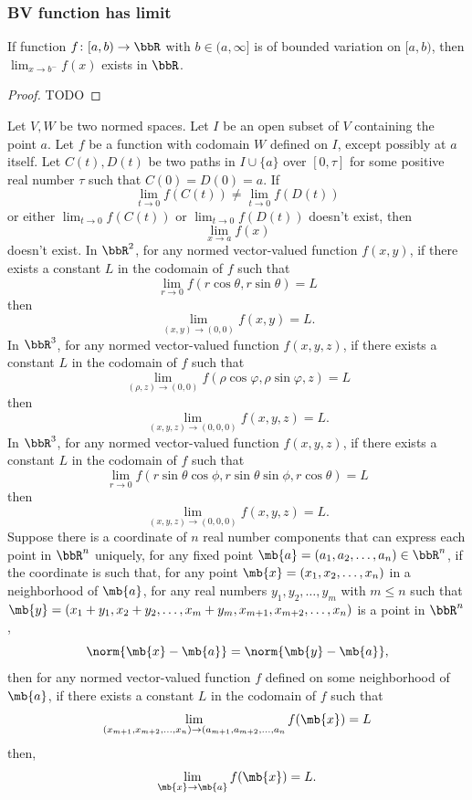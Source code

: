 \subsubsection{BV function has limit}
If function $f\colon[a,b)\to\bbR$ with $b\in(a,\infty]$ is of bounded variation on $[a,b)$, then $\lim_{x\to b^-}f(x)$ exists in $\bbR$.
\begin{proof}
TODO
\end{proof}
Let $V,W$ be two normed spaces. Let $I$ be an open subset of $V$ containing the point $a$. Let $f$ be a function with codomain $W$ defined on $I$, except possibly at $a$ itself. Let $C(t),D(t)$ be two paths in $I\cup\{a\}$ over $[0,\tau]$ for some positive real number $\tau$ such that $C(0)=D(0)=a$. If
\[\lim_{t\to 0}f(C(t))\neq\lim_{t\to 0}f(D(t))\]
or either $\lim_{t\to 0}f(C(t))$ or $\lim_{t\to 0}f(D(t))$ doesn't exist, then
\[\lim_{x\to a}f(x)\]
doesn't exist.
In $\bbR^2$, for any normed vector-valued function $f(x,y)$, if there exists a constant $L$ in the codomain of $f$ such that
\[\lim_{r\to 0}f(r\cos\theta,r\sin\theta)=L\]
then
\[\lim_{(x,y)\to(0,0)}f(x,y)=L.\]
In $\bbR^3$, for any normed vector-valued function $f(x,y,z)$, if there exists a constant $L$ in the codomain of $f$ such that
\[\lim_{(\rho,z)\to(0,0)}f(\rho\cos\varphi,\rho\sin\varphi,z)=L\]
then
\[\lim_{(x,y,z)\to(0,0,0)}f(x,y,z)=L.\]
In $\bbR^3$, for any normed vector-valued function $f(x,y,z)$, if there exists a constant $L$ in the codomain of $f$ such that
\[\lim_{r\to 0}f(r\sin\theta\cos\phi,r\sin\theta\sin\phi,r\cos\theta)=L\]
then
\[\lim_{(x,y,z)\to(0,0,0)}f(x,y,z)=L.\]
Suppose there is a coordinate of $n$ real number components that can express each point in $\bbR^n$ uniquely, for any fixed point $\mb{a}=(a_1,a_2,\ldots,a_n)\in\bbR^n$, if the coordinate is such that, for any point $\mb{x}=(x_1,x_2,\ldots,x_n)$ in a neighborhood of $\mb{a}$, for any real numbers $y_1,y_2,\ldots,y_m$ with $m\leq n$ such that $\mb{y}=(x_1+y_1,x_2+y_2,\ldots,x_m+y_m,x_{m+1},x_{m+2},\ldots,x_n)$ is a point in $\bbR^n$,
\[\norm{\mb{x}-\mb{a}}=\norm{\mb{y}-\mb{a}},\]
then for any normed vector-valued function $f$ defined on some neighborhood of $\mb{a}$, if there exists a constant $L$ in the codomain of $f$ such that
\[\lim_{(x_{m+1},x_{m+2},\ldots,x_n)\to(a_{m+1},a_{m+2},\ldots,a_n}f(\mb{x})=L\]
then,
\[\lim_{\mb{x}\to\mb{a}}f(\mb{x})=L.\]
